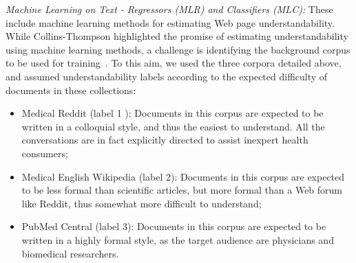 \documentclass[10pt,a4paper]{article}
\begin{document}
\begin{table}[!tb]
	\centering    
	\caption{Statistics for the corpora used as background models for understandability estimations.}
	\label{tab:collection_stats}
\end{table}


\textit{Machine Learning on Text - Regressors (MLR) and Classifiers (MLC):} These include machine learning methods for estimating Web page understandability. While Collins-Thompson highlighted the promise of estimating understandability using machine learning methods, a challenge is identifying the background corpus to be used for training~\cite{collins2014computational}. To this aim, we used the three corpora detailed above, and assumed understandability labels according to the expected difficulty of documents in these collections:

\begin{itemize}[leftmargin=*]
    \item Medical Reddit (label 1 ): Documents in this corpus are expected to be written in a colloquial style, and thus the easiest to understand. All the conversations are in fact explicitly directed to assist inexpert health consumers;
	\item Medical English Wikipedia (label 2): Documents in this corpus are expected to be less formal than scientific articles, but more formal than a Web forum like Reddit, thus somewhat more difficult to understand;
	\item PubMed Central (label 3): Documents in this corpus are expected to be written in a highly formal style, as the target audience are physicians and biomedical researchers.
\end{itemize}
\end{document}
